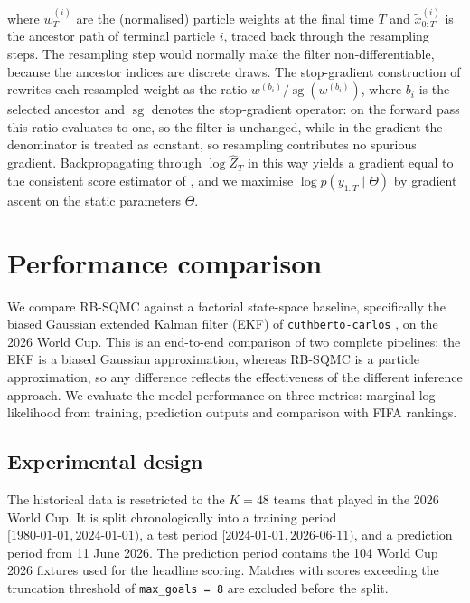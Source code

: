 where $w_T^{(i)}$ are the (normalised) particle weights at the final time $T$ and $\widetilde{x}_{0:T}^{(i)}$ is the ancestor path of terminal particle $i$, traced back through the resampling steps. The resampling step would normally make the filter non-differentiable, because the ancestor indices are discrete draws. The stop-gradient construction of \citet{scibior2021differentiableparticlefiltering} rewrites each resampled weight as the ratio $w^{(b_i)} / \operatorname{sg}(w^{(b_i)})$, where $b_i$ is the selected ancestor and $\operatorname{sg}$ denotes the stop-gradient operator: on the forward pass this ratio evaluates to one, so the filter is unchanged, while in the gradient the denominator is treated as constant, so resampling contributes no spurious gradient. Backpropagating through $\log \widehat Z_T$ in this way yields a gradient equal to the consistent score estimator of \citet{poyiadjisdoucetsingh2011particlescore}, and we maximise $\log p(y_{1:T} \mid \Theta)$ by gradient ascent on the static parameters $\Theta$.


\section{Performance comparison}
\label{sec:performance-comparison}

We compare RB-SQMC against a factorial state-space baseline, specifically the biased Gaussian extended Kalman filter (EKF) of \texttt{cuthberto-carlos} \citep{cuthbertocarlos2026}, on the 2026 World Cup. This is an end-to-end comparison of two complete pipelines: the EKF is a biased Gaussian approximation, whereas RB-SQMC is a particle approximation, so any difference reflects the effectiveness of the different inference approach. We evaluate the model performance on three metrics: marginal log-likelihood from training, prediction outputs and comparison with FIFA rankings.

\subsection{Experimental design}

The historical data is resetricted to the $K=48$ teams that played in the 2026 World Cup. It is split chronologically into a training period $[1980\text{-}01\text{-}01, 2024\text{-}01\text{-}01)$, a test period $[2024\text{-}01\text{-}01, 2026\text{-}06\text{-}11)$, and a prediction period from 11 June 2026. The prediction period contains the 104 World Cup 2026 fixtures used for the headline scoring. Matches with scores exceeding the truncation threshold of \texttt{max\_goals = 8} are excluded before the split. 

